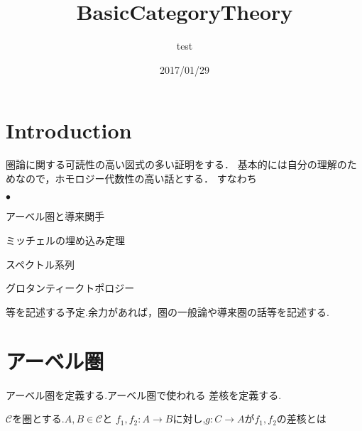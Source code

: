 \documentclass{ujarticle}
\title{BasicCategoryTheory}
\author{test}
\date{2017/01/29}
\renewenvironment{itemize}%
{%
   \begin{list}{\parbox{1zw}{$\bullet$}}%
   {%
      \setlength{\topsep}{0zh}
      \setlength{\itemindent}{0zw}
      \setlength{\leftmargin}{2zw}%
      \setlength{\rightmargin}{0zw}%
      \setlength{\labelsep}{1zw}%
      \setlength{\labelwidth}{3zw}%
      \setlength{\itemsep}{0em}%
      \setlength{\parsep}{0em}%
      \setlength{\listparindent}{0zw}%
   }
}{%
   \end{list}%
}
\begin{document}
\section{Introduction}
\label{sec:Introduction}
圏論に関する可読性の高い図式の多い証明をする．
基本的には自分の理解のためなので，ホモロジー代数性の高い話とする．
すなわち
\begin{itemize}
  \item アーベル圏と導来関手
  \item ミッチェルの埋め込み定理
  \item スペクトル系列
  \item グロタンティークトポロジー
\end{itemize}
等を記述する予定.余力があれば，圏の一般論や導来圏の話等を記述する.



\section{アーベル圏}
\label{sec:アーベル圏}
アーベル圏を定義する.アーベル圏で使われる
差核を定義する.
\begin{dfn}
 $\mathcal{C}$を圏とする.$A,B \in \mathcal{C}$と
 $f_1,f_2:A \to B$に対し,$g:C \to A$が$f_1,f_2$の差核とは
\end{dfn}
\end{document}
